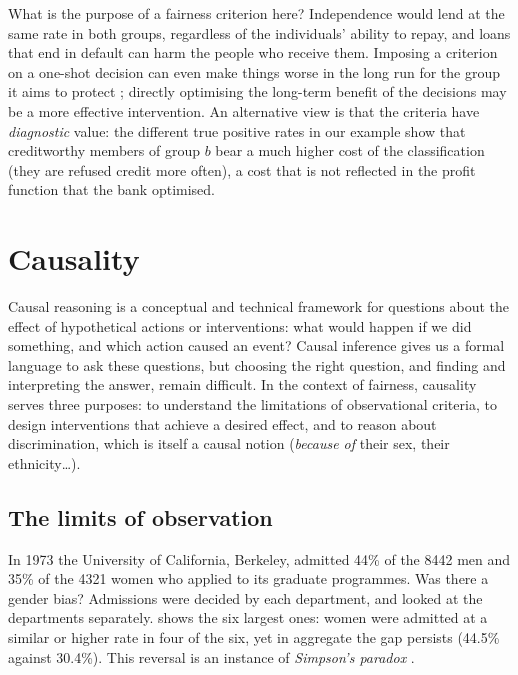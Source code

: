What is the purpose of a fairness criterion here? Independence would lend at the same rate in
both groups, regardless of the individuals' ability to repay, and loans that end in default can
harm the people who receive them. Imposing a criterion on a one-shot decision can even make things
worse in the long run for the group it aims to protect \citep{liu2018delayed}; directly optimising
the long-term benefit of the decisions may be a more effective intervention. An alternative view
is that the criteria have \emph{diagnostic} value: the different true positive rates in our
example show that creditworthy members of group $b$ bear a much higher cost of the classification
(they are refused credit more often), a cost that is not reflected in the profit function that
the bank optimised.

\section{Causality}\label{sec:causality}

Causal reasoning is a conceptual and technical framework for questions about the effect of
hypothetical actions or interventions: what would happen if we did something, and which action
caused an event? Causal inference gives us a formal language to ask these questions, but choosing the right question, and finding and interpreting the
answer, remain difficult. In the context of fairness, causality serves three purposes: to understand the limitations
of observational criteria, to design interventions that achieve a desired effect, and to reason
about discrimination, which is itself a causal notion (\emph{because of} their sex, their
ethnicity\dots).

\subsection{The limits of observation}

In 1973 the University of California, Berkeley, admitted 44\% of the 8442 men and 35\% of the
4321 women who applied to its graduate programmes. Was there a gender bias? Admissions were
decided by each department, and \citet{bickel1975sex} looked at the departments separately.
 shows the six largest ones: women were admitted at a similar or higher rate
in four of the six, yet in aggregate the gap persists (44.5\% against 30.4\%). This reversal is an
instance of \emph{Simpson's paradox} \citep{simpson1951interpretation}.

